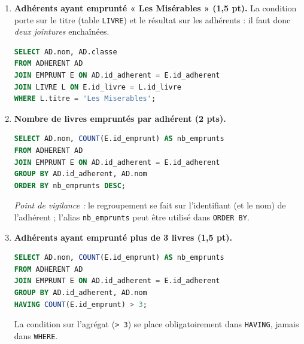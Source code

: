 \documentclass[11pt]{article}
\begin{document}
\begin{corrige}
\begin{enumerate}
\begin{lstlisting}[language=SQL]
CREATE TABLE EMPRUNT (
    id_emprunt INT PRIMARY KEY AUTO_INCREMENT,
    id_adherent INT NOT NULL,
    id_livre INT NOT NULL,
    date_emprunt DATE,
    date_retour_prevue DATE,
    FOREIGN KEY (id_adherent) REFERENCES ADHERENT(id_adherent),
    FOREIGN KEY (id_livre) REFERENCES LIVRE(id_livre)
);
\end{lstlisting}
\emph{Points de vigilance :} créer les tables parentes \emph{avant} la table \texttt{EMPRUNT} (sinon les clés étrangères ne peuvent pas être déclarées) ; chaque \texttt{FOREIGN KEY} doit référencer la clé primaire de la table parente.
\item \textbf{Adhérents ayant emprunté « Les Misérables » (1,5 pt).} La condition porte sur le titre (table \texttt{LIVRE}) et le résultat sur les adhérents : il faut donc \emph{deux jointures} enchaînées.
\begin{lstlisting}[language=SQL]
SELECT AD.nom, AD.classe
FROM ADHERENT AD
JOIN EMPRUNT E ON AD.id_adherent = E.id_adherent
JOIN LIVRE L ON E.id_livre = L.id_livre
WHERE L.titre = 'Les Miserables';
\end{lstlisting}
\item \textbf{Nombre de livres empruntés par adhérent (2 pts).}
\begin{lstlisting}[language=SQL]
SELECT AD.nom, COUNT(E.id_emprunt) AS nb_emprunts
FROM ADHERENT AD
JOIN EMPRUNT E ON AD.id_adherent = E.id_adherent
GROUP BY AD.id_adherent, AD.nom
ORDER BY nb_emprunts DESC;
\end{lstlisting}
\emph{Point de vigilance :} le regroupement se fait sur l'identifiant (et le nom) de l'adhérent ; l'alias \texttt{nb\_emprunts} peut être utilisé dans \texttt{ORDER BY}.
\item \textbf{Adhérents ayant emprunté plus de 3 livres (1,5 pt).}
\begin{lstlisting}[language=SQL]
SELECT AD.nom, COUNT(E.id_emprunt) AS nb_emprunts
FROM ADHERENT AD
JOIN EMPRUNT E ON AD.id_adherent = E.id_adherent
GROUP BY AD.id_adherent, AD.nom
HAVING COUNT(E.id_emprunt) > 3;
\end{lstlisting}
La condition sur l'agrégat (\texttt{> 3}) se place obligatoirement dans \texttt{HAVING}, jamais dans \texttt{WHERE}.
\end{enumerate}
\end{corrige}
\end{document}
